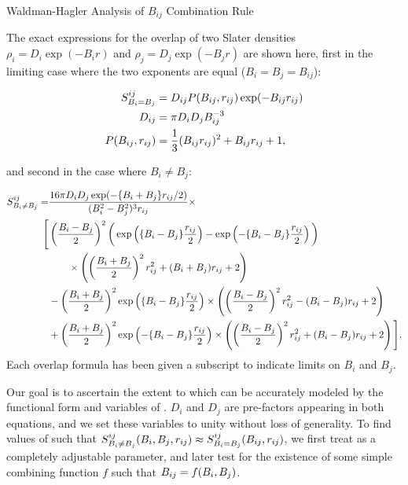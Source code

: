 \begin{section}{Waldman-Hagler Analysis of $B_{ij}$ Combination Rule}
\label{sec:bij_combo_rule}

The exact expressions for the overlap of two Slater densities 
$\rho_i = D_i \exp(-B_i r)$ and $\rho_j = D_j \exp(-B_j r)$ 
are shown here, first in the limiting case where the two
exponents are equal ($B_i = B_j = B_{ij}$): 

\begin{align}
\label{eq:simple_overlap}
\begin{split}
S^{ij}_{B_i = B_j} &= D_{ij} P(B_{ij}, r_{ij}) \exp(-B_{ij}r_{ij}) \\
D_{ij} &= \pi D_i D_j B_{ij}^{-3} \\
P(B_{ij},r_{ij}) &= \frac13 (B_{ij} r_{ij})^2 + B_{ij} r_{ij} + 1 ,
\end{split}
\end{align}

and second in the case where $B_i \ne B_j$:

\begin{align}
\label{eq:complicated_overlap}
\begin{split}
S^{ij}_{B_i \ne B_j} = &
\frac{16\pi D_i D_j \exp(-\{B_i + B_j\}r_{ij}/2)}{(B_i^2-B_j^2)^3r_{ij}}
\times \\
\Bigg [ &
\left(\frac{B_i - B_j}{2}\right)^2 
\bigg(\exp \left(\{B_i-B_j\}\frac{r_{ij}}{2}\right) - \exp \left(-\{B_i-B_j\}\frac{r_{ij}}{2}\right) \bigg) \\
& \qquad \times \left( \left(\frac{B_i + B_j}{2}\right)^2r_{ij}^2 + (B_i + B_j)r_{ij} + 2 \right) \\
& - \left(\frac{B_i + B_j}{2}\right)^2 \exp \left(\{B_i-B_j\}\frac{r_{ij}}{2}\right)
\times \left( \left(\frac{B_i - B_j}{2}\right)^2r_{ij}^2 - (B_i - B_j)r_{ij} + 2 \right) \\
& + \left(\frac{B_i + B_j}{2}\right)^2 \exp \left(-\{B_i-B_j\}\frac{r_{ij}}{2}\right)
\times \left( \left(\frac{B_i - B_j}{2}\right)^2r_{ij}^2 + (B_i - B_j)r_{ij} + 2 \right)
\Bigg ] .
\end{split}
\end{align}
Each overlap formula has been given a subscript to indicate
limits on $B_i$ and $B_j$.

Our goal is to ascertain the extent to which \sijexact can
be accurately modeled by the functional form and variables of \sijapprox.
$D_i$ and $D_j$ are pre-factors appearing in both equations, and we set
these variables to unity without loss of generality. To 
find values of \B such that $S^{ij}_{B_i \ne B_j}(B_i,B_j,r_{ij}) \approx
S^{ij}_{B_i = B_j}(B_{ij},r_{ij})$, we first treat \B as a completely adjustable
parameter, and later test for the existence of some simple combining function
$f$ such that $B_{ij} = f(B_i, B_j)$.


\end{section}

